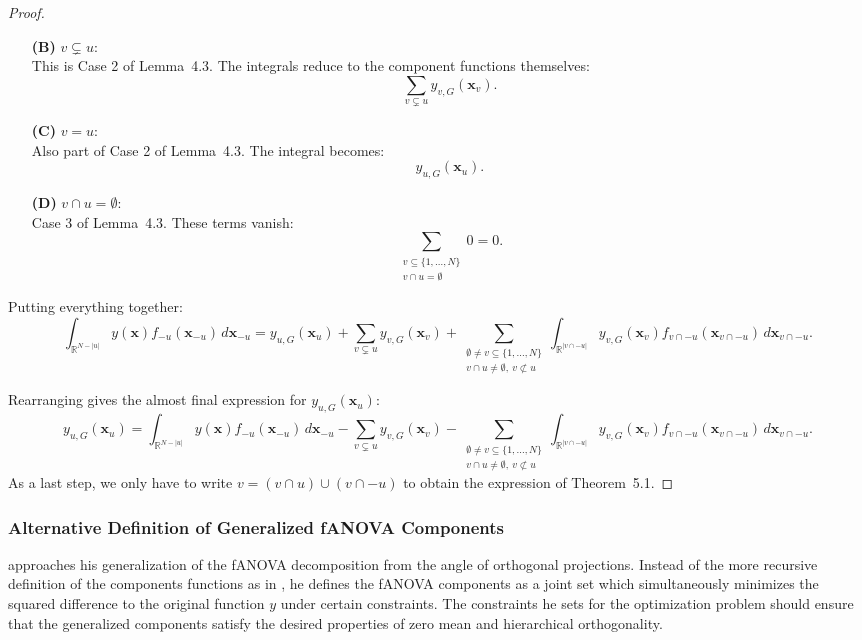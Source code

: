 \begin{proof}
\begin{itemize}
  \item[\textbf{(B)}] \( v \subsetneq u \): \\
  This is Case 2 of Lemma~4.3. The integrals reduce to the component functions themselves:
  \[
  \sum_{v \subsetneq u} y_{v,G}(\mathbf{x}_v).
  \]

  \item[\textbf{(C)}] \( v = u \): \\
  Also part of Case 2 of Lemma~4.3. The integral becomes:
  \[
  y_{u,G}(\mathbf{x}_u).
  \]

  \item[\textbf{(D)}] \( v \cap u = \emptyset \): \\
  Case 3 of Lemma~4.3. These terms vanish:
  \[
  \sum_{\substack{v \subseteq \{1,\dots,N\} \\ v \cap u = \emptyset}} 0 = 0.
  \]
\end{itemize}

Putting everything together:
\[
\int_{\mathbb{R}^{N - |u|}} y(\mathbf{x}) f_{-u}(\mathbf{x}_{-u}) \, d\mathbf{x}_{-u}
= y_{u,G}(\mathbf{x}_u)
+ \sum_{v \subsetneq u} y_{v,G}(\mathbf{x}_v)
+ \sum_{\substack{\emptyset \ne v \subseteq \{1,\dots,N\} \\ v \cap u \ne \emptyset,\ v \not\subset u}} 
\int_{\mathbb{R}^{|v \cap -u|}} y_{v,G}(\mathbf{x}_v) f_{v \cap -u}(\mathbf{x}_{v \cap -u}) \, d\mathbf{x}_{v \cap -u}.
\]

Rearranging gives the almost final expression for \( y_{u,G}(\mathbf{x}_u) \):
\[
y_{u,G}(\mathbf{x}_u)
= \int_{\mathbb{R}^{N - |u|}} y(\mathbf{x}) f_{-u}(\mathbf{x}_{-u}) \, d\mathbf{x}_{-u}
- \sum_{v \subsetneq u} y_{v,G}(\mathbf{x}_v)
- \sum_{\substack{\emptyset \ne v \subseteq \{1,\dots,N\} \\ v \cap u \ne \emptyset,\ v \not\subset u}} 
\int_{\mathbb{R}^{|v \cap -u|}} y_{v,G}(\mathbf{x}_v) f_{v \cap -u}(\mathbf{x}_{v \cap -u}) \, d\mathbf{x}_{v \cap -u}.
\]
As a last step, we only have to write \( v = (v \cap u) \cup (v \cap -u) \) to obtain the expression of Theorem~5.1.

\end{proof}

\subsubsection{Alternative Definition of Generalized fANOVA Components}
\cite{hooker2007} approaches his generalization of the fANOVA decomposition from the angle of orthogonal projections. Instead of the more recursive definition of the components functions as in \cite{rahman2014}, he defines the fANOVA components as a joint set which simultaneously minimizes the squared difference to the original function $y$ under certain constraints.
The constraints he sets for the optimization problem should ensure that the generalized components satisfy the desired properties of zero mean and hierarchical orthogonality.

